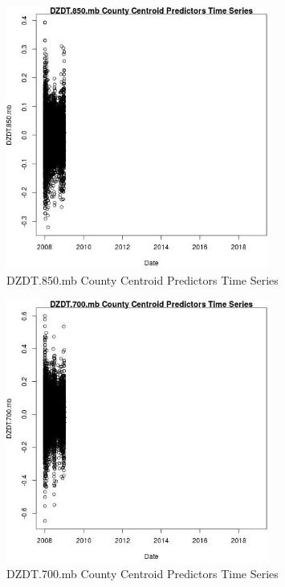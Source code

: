 \begin{figure} 
\centering  
\includegraphics[width=0.77\textwidth]{Code_Outputs/df_report_ML_predictors_CountyCentroid_Locations_Dates_2008-01-01to2018-12-31_DZDT850mbvDate.jpg} 
\caption{\label{fig:df_report_ML_predictors_CountyCentroid_Locations_Dates_2008-01-01to2018-12-31DZDT850mbvDate}DZDT.850.mb County Centroid Predictors Time Series} 
\end{figure} 
 

\clearpage 

\begin{figure} 
\centering  
\includegraphics[width=0.77\textwidth]{Code_Outputs/df_report_ML_predictors_CountyCentroid_Locations_Dates_2008-01-01to2018-12-31_DZDT700mbvDate.jpg} 
\caption{\label{fig:df_report_ML_predictors_CountyCentroid_Locations_Dates_2008-01-01to2018-12-31DZDT700mbvDate}DZDT.700.mb County Centroid Predictors Time Series} 
\end{figure} 
 

